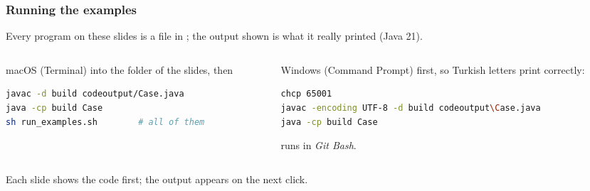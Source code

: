 \documentclass[aspectratio=169,10pt,compress]{beamer}
\begin{document}
\begin{frame}[t,fragile] \frametitle{Running the examples}
  \small Every program on these slides is a file in ; the output shown is what it really printed (Java 21).
  \begin{columns}[T]
    \begin{column}{0.48\textwidth}
      \begin{block}{macOS (Terminal)}
        \footnotesize
         into the folder of the slides, then


\begin{lstlisting}[style=codesnippet, language=bash]
javac -d build codeoutput/Case.java
java -cp build Case
sh run_examples.sh        # all of them
\end{lstlisting}



      \end{block}
    \end{column}
    \begin{column}{0.48\textwidth}
      \begin{block}{Windows (Command Prompt)}
        \footnotesize
         first, so Turkish letters print correctly:


\begin{lstlisting}[style=codesnippet, language=bash]
chcp 65001
javac -encoding UTF-8 -d build codeoutput\Case.java
java -cp build Case
\end{lstlisting}



         runs in \emph{Git Bash}.
      \end{block}
    \end{column}
  \end{columns}
  \vspace{0.3em}
  \small Each slide shows the code first; the output appears on the next click. 
\end{frame}




\end{document}
